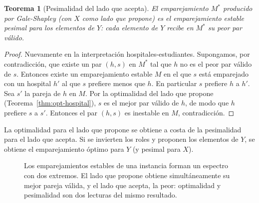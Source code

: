 \documentclass[12pt, spanish, oneside, openany]{book}
\theoremstyle{uprightplain}
\newtheorem{teorema}{Teorema}[section]
\theoremstyle{definition}
\theoremstyle{remark}
\theoremstyle{definition}
\begin{document}
\begin{teorema}[Pesimalidad del lado que acepta]
\label{thm:pesimal}
El emparejamiento $M^*$ producido por Gale-Shapley (con $X$ como lado que propone) es el emparejamiento estable pesimal para los elementos de $Y$: cada elemento de $Y$ recibe en $M^*$ su peor par válido.
\end{teorema}
\begin{proof}
Nuevamente en la interpretación hospitales-estudiantes. Supongamos, por contradicción, que existe un par $(h,s)$ en $M^*$ tal que $h$ no es el peor par válido de $s$. Entonces existe un emparejamiento estable $M$ en el que $s$ está emparejado con un hospital $h'$ al que $s$ prefiere menos que $h$. En particular $s$ prefiere $h$ a $h'$. Sea $s'$ la pareja de $h$ en $M$. Por la optimalidad del lado que propone (Teorema~\ref{thm:opt-hospital}), $s$ es el mejor par válido de $h$, de modo que $h$ prefiere $s$ a $s'$. Entonces el par $(h,s)$ es inestable en $M$, contradicción.
\end{proof}

La optimalidad para el lado que propone se obtiene a costa de la pesimalidad para el lado que acepta. Si se invierten los roles y proponen los elementos de $Y$, se obtiene el emparejamiento óptimo para $Y$ (y pesimal para $X$).
\begin{figure}[H]
\centering
{}
\caption{Los emparejamientos estables de una instancia forman un espectro con
dos extremos. El lado que propone obtiene simultáneamente su mejor pareja
válida, y el lado que acepta, la peor: optimalidad y pesimalidad son dos
lecturas del mismo resultado.}
\label{fig:espectro}
\end{figure}
\end{document}
